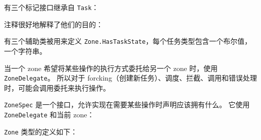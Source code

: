 


有三个标记接口继承自 \texttt{Task}：




注释很好地解释了他们的目的：




有三个辅助类被用来定义 \texttt{Zone.HasTaskState}，每个任务类型包含一个布尔值，一个字符串。




当一个 zone 希望将某些操作的执行方式委托给另一个 zone 时，使用 \texttt{ZoneDelegate}。
所以对于 forcking（创建新任务）、调度、拦截、调用和错误处理时，可能会调用委托来执行操作。




\texttt{ZoneSpec} 是一个接口，允许实现在需要某些操作时声明应该拥有什么。
它使用 \texttt{ZoneDelegate} 和当前 zone：




\texttt{Zone} 类型的定义如下：




